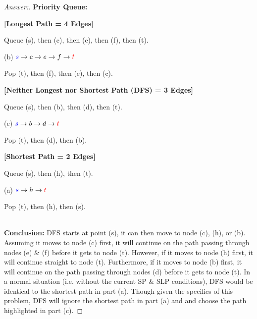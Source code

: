 \documentclass[11pt]{article}
\theoremstyle{definition}
\theoremstyle{definition}
\theoremstyle{definition}
\begin{document}
\begin{proof}[Answer:]
\item \textbf{Priority Queue:}
\\
\item \textbf{[Longest Path = 4 Edges]}
\item	\hspace*{10mm} Queue (s), then (c), then (e), then (f), then (t).
\item	\hspace*{20mm} (b) $\textcolor{blue}s \to c \to e \to f \to \textcolor{red}t$ 
\item	\hspace*{30mm} Pop (t), then (f), then (e), then (c).
\\
\item \textbf{[Neither Longest nor Shortest Path (DFS) = 3 Edges]}
\item	\hspace*{10mm} Queue (s), then (b), then (d), then (t).
\item	\hspace*{20mm} (c) $\textcolor{blue}s \to b \to d \to \textcolor{red}t$ 
\item	\hspace*{30mm} Pop (t), then (d), then (b).
\\
\item \textbf{[Shortest Path = 2 Edges]}
\item	\hspace*{10mm} Queue (s), then (h), then (t).
\item	\hspace*{20mm} (a) $\textcolor{blue}s \to h \to \textcolor{red}t$ 
\item	\hspace*{30mm} Pop (t), then (h), then (s).
\\ \\
\item \textbf{Conclusion:} DFS starts at point (s), it can then move to node (c), (h), or (b). Assuming it moves to node (c) first, it will continue on the path passing through nodes (e) \& (f) before it gets to node (t). However, if it moves to node (h) first, it will continue straight to node (t). Furthermore, if it moves to node (b) first, it will continue on the path passing through nodes (d) before it gets to node (t). In a normal situation (i.e. without the current SP \& SLP conditions), DFS would be identical to the shortest path in part (a). Though given the specifics of this problem, DFS will ignore the shortest path in part (a) and and choose the path highlighted in part (c).
\end{proof}




\end{document}
